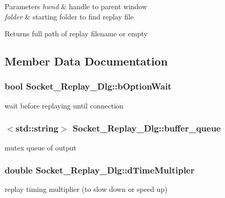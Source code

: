 \begin{DoxyParams}{Parameters}
{\em hwnd} & handle to parent window \\
\hline
{\em folder} & starting folder to find replay file \\
\hline
\end{DoxyParams}
\begin{DoxyReturn}{Returns}
full path of replay filename or empty 
\end{DoxyReturn}


\subsection{Member Data Documentation}
\hypertarget{class_socket___replay___dlg_a2f5d345ed86ec71d60e51b5583cda8b3}{}
\subsubsection[{b\+Option\+Wait}]{\setlength{\rightskip}{0pt plus 5cm}bool Socket\+\_\+\+Replay\+\_\+\+Dlg\+::b\+Option\+Wait}\label{class_socket___replay___dlg_a2f5d345ed86ec71d60e51b5583cda8b3}
wait before replaying until connection \hypertarget{class_socket___replay___dlg_abd2145fb90191384c2c5928d72e9d379}{}
\subsubsection[{buffer\+\_\+queue}]{$<$std\+::string$>$ Socket\+\_\+\+Replay\+\_\+\+Dlg\+::buffer\+\_\+queue\hspace{0.3cm}{\ttfamily [protected]}}\label{class_socket___replay___dlg_abd2145fb90191384c2c5928d72e9d379}
mutex queue of output \hypertarget{class_socket___replay___dlg_a8e885816d205a4d5546284fb776fb6a9}{}
\subsubsection[{d\+Time\+Multipler}]{\setlength{\rightskip}{0pt plus 5cm}double Socket\+\_\+\+Replay\+\_\+\+Dlg\+::d\+Time\+Multipler\hspace{0.3cm}{\ttfamily [protected]}}\label{class_socket___replay___dlg_a8e885816d205a4d5546284fb776fb6a9}
replay timing multiplier (to slow down or speed up) \hypertarget{class_socket___replay___dlg_a6f6192476df2dab219666f4bf716631e}{}
